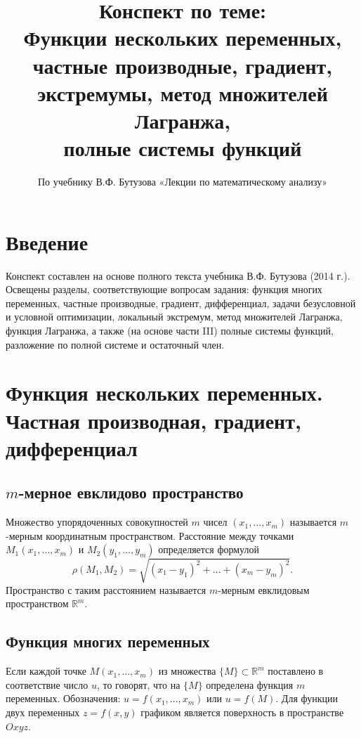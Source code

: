 \documentclass{article}
\theoremstyle{definition}
\begin{document}
\title{Конспект по теме: \\ Функции нескольких переменных, \\ частные производные, градиент, \\ экстремумы, метод множителей Лагранжа, \\ полные системы функций}
\author{По учебнику В.Ф. Бутузова «Лекции по математическому анализу»}
\date{}
\maketitle

\section*{Введение}
Конспект составлен на основе полного текста учебника В.Ф. Бутузова (2014 г.). Освещены разделы, соответствующие вопросам задания: функция многих переменных, частные производные, градиент, дифференциал, задачи безусловной и условной оптимизации, локальный экстремум, метод множителей Лагранжа, функция Лагранжа, а также (на основе части III) полные системы функций, разложение по полной системе и остаточный член.

\section{Функция нескольких переменных. Частная производная, градиент, дифференциал}

\subsection{$m$-мерное евклидово пространство}
Множество упорядоченных совокупностей $m$ чисел $(x_1,\dots,x_m)$ называется $m$-мерным координатным пространством. Расстояние между точками $M_1(x_1,\dots,x_m)$ и $M_2(y_1,\dots,y_m)$ определяется формулой
\[
\rho(M_1,M_2)=\sqrt{(x_1-y_1)^2+\dots+(x_m-y_m)^2}.
\]
Пространство с таким расстоянием называется $m$-мерным евклидовым пространством $\mathbb{R}^m$.

\subsection{Функция многих переменных}
Если каждой точке $M(x_1,\dots,x_m)$ из множества $\{M\}\subset\mathbb{R}^m$ поставлено в соответствие число $u$, то говорят, что на $\{M\}$ определена функция $m$ переменных. Обозначения: $u=f(x_1,\dots,x_m)$ или $u=f(M)$.
Для функции двух переменных $z=f(x,y)$ графиком является поверхность в пространстве $Oxyz$.
\end{document}
